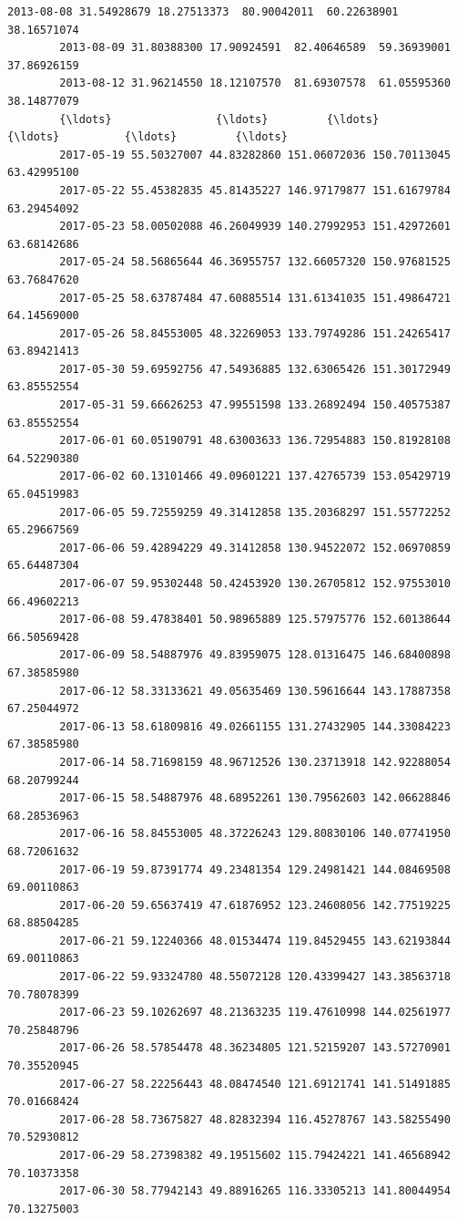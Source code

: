 \documentclass[11pt]{article}
\begin{document}
\begin{Verbatim}[commandchars=\\\{\}]
        2013-08-08 31.54928679 18.27513373  80.90042011  60.22638901 38.16571074   
        2013-08-09 31.80388300 17.90924591  82.40646589  59.36939001 37.86926159   
        2013-08-12 31.96214550 18.12107570  81.69307578  61.05595360 38.14877079   
        {\ldots}                {\ldots}         {\ldots}          {\ldots}          {\ldots}         {\ldots}   
        2017-05-19 55.50327007 44.83282860 151.06072036 150.70113045 63.42995100   
        2017-05-22 55.45382835 45.81435227 146.97179877 151.61679784 63.29454092   
        2017-05-23 58.00502088 46.26049939 140.27992953 151.42972601 63.68142686   
        2017-05-24 58.56865644 46.36955757 132.66057320 150.97681525 63.76847620   
        2017-05-25 58.63787484 47.60885514 131.61341035 151.49864721 64.14569000   
        2017-05-26 58.84553005 48.32269053 133.79749286 151.24265417 63.89421413   
        2017-05-30 59.69592756 47.54936885 132.63065426 151.30172949 63.85552554   
        2017-05-31 59.66626253 47.99551598 133.26892494 150.40575387 63.85552554   
        2017-06-01 60.05190791 48.63003633 136.72954883 150.81928108 64.52290380   
        2017-06-02 60.13101466 49.09601221 137.42765739 153.05429719 65.04519983   
        2017-06-05 59.72559259 49.31412858 135.20368297 151.55772252 65.29667569   
        2017-06-06 59.42894229 49.31412858 130.94522072 152.06970859 65.64487304   
        2017-06-07 59.95302448 50.42453920 130.26705812 152.97553010 66.49602213   
        2017-06-08 59.47838401 50.98965889 125.57975776 152.60138644 66.50569428   
        2017-06-09 58.54887976 49.83959075 128.01316475 146.68400898 67.38585980   
        2017-06-12 58.33133621 49.05635469 130.59616644 143.17887358 67.25044972   
        2017-06-13 58.61809816 49.02661155 131.27432905 144.33084223 67.38585980   
        2017-06-14 58.71698159 48.96712526 130.23713918 142.92288054 68.20799244   
        2017-06-15 58.54887976 48.68952261 130.79562603 142.06628846 68.28536963   
        2017-06-16 58.84553005 48.37226243 129.80830106 140.07741950 68.72061632   
        2017-06-19 59.87391774 49.23481354 129.24981421 144.08469508 69.00110863   
        2017-06-20 59.65637419 47.61876952 123.24608056 142.77519225 68.88504285   
        2017-06-21 59.12240366 48.01534474 119.84529455 143.62193844 69.00110863   
        2017-06-22 59.93324780 48.55072128 120.43399427 143.38563718 70.78078399   
        2017-06-23 59.10262697 48.21363235 119.47610998 144.02561977 70.25848796   
        2017-06-26 58.57854478 48.36234805 121.52159207 143.57270901 70.35520945   
        2017-06-27 58.22256443 48.08474540 121.69121741 141.51491885 70.01668424   
        2017-06-28 58.73675827 48.82832394 116.45278767 143.58255490 70.52930812   
        2017-06-29 58.27398382 49.19515602 115.79424221 141.46568942 70.10373358   
        2017-06-30 58.77942143 49.88916265 116.33305213 141.80044954 70.13275003   
        

\end{Verbatim}
\end{document}
